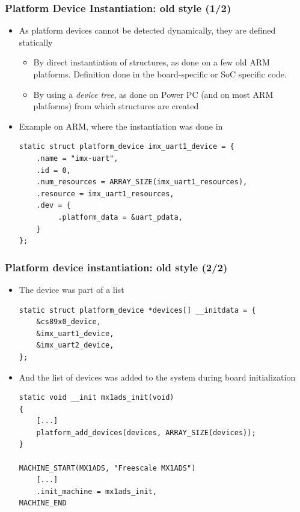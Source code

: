 \begin{frame}[fragile]
  \frametitle{Platform Device Instantiation: old style (1/2)}
  \begin{itemize}
  \item As platform devices cannot be detected dynamically, they are
    defined statically
    \begin{itemize}
    \item By direct instantiation of 
      structures, as done on a few old ARM platforms. Definition done in
      the board-specific or SoC specific code.
    \item By using a \emph{device tree}, as done on Power PC (and on
      most ARM platforms) from which 
      structures are created
    \end{itemize}
  \item Example on ARM, where the instantiation was done in
    \begin{block}{}
\begin{verbatim}
static struct platform_device imx_uart1_device = {
    .name = "imx-uart",
    .id = 0,
    .num_resources = ARRAY_SIZE(imx_uart1_resources),
    .resource = imx_uart1_resources,
    .dev = {
         .platform_data = &uart_pdata,
    }
};
\end{verbatim}
\end{block}
\end{itemize}
\end{frame}

\begin{frame}[fragile]
  \frametitle{Platform device instantiation: old style (2/2)}
  \begin{itemize}
  \item The device was part of a list
    \begin{block}{}
  \begin{verbatim}
static struct platform_device *devices[] __initdata = {
    &cs89x0_device,
    &imx_uart1_device,
    &imx_uart2_device,
};
  \end{verbatim}
  \end{block}
  \item And the list of devices was added to the system during
    board initialization
    \begin{block}{}
  \begin{verbatim}
static void __init mx1ads_init(void)
{
    [...]
    platform_add_devices(devices, ARRAY_SIZE(devices));
}

MACHINE_START(MX1ADS, "Freescale MX1ADS")
    [...]
    .init_machine = mx1ads_init,
MACHINE_END
  \end{verbatim}
  \end{block}
  \end{itemize}
\end{frame}

